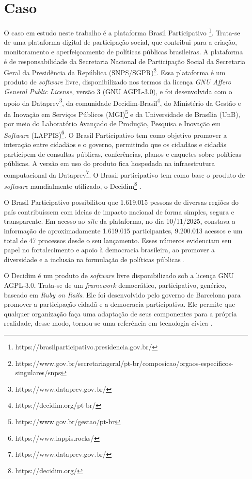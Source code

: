 \section{Caso}
O caso em estudo neste trabalho é a plataforma Brasil Participativo \footnote{https://brasilparticipativo.presidencia.gov.br/}. Trata-se de uma plataforma digital de participação social, que contribui para a criação, monitoramento e aperfeiçoamento de políticas públicas brasileiras. A plataforma é de responsabilidade da Secretaria Nacional de Participação Social da Secretaria Geral da Presidência da República (SNPS/SGPR)\footnote{https://www.gov.br/secretariageral/pt-br/composicao/orgaos-especificos-singulares/snps}. Essa plataforma é um produto de \textit{software} livre, disponibilizado nos termos da licença \textit{GNU Affero General Public License}, versão 3 (GNU AGPL-3.0), e foi desenvolvida com o apoio da Dataprev\footnote{https://www.dataprev.gov.br/}, da comunidade Decidim-Brasil\footnote{https://decidim.org/pt-br/}, do Ministério da Gestão e da Inovação em Serviços Públicos (MGI)\footnote{https://www.gov.br/gestao/pt-br} e da Universidade de Brasília (UnB), por meio do Laboratório Avançado de Produção, Pesquisa e Inovação em \textit{Software} (LAPPIS)\footnote{https://www.lappis.rocks/}. 
O Brasil Participativo tem como objetivo promover a interação entre cidadãos e o governo, permitindo que os cidadãos e cidadãs participem de consultas públicas, conferências, planos e enquetes sobre políticas públicas. 
A versão em uso do produto fica hospedada na infraestrutura computacional da Dataprev\footnote{https://www.dataprev.gov.br/}. O Brasil participativo tem como base o produto de \textit{software} mundialmente utilizado, o Decidim\footnote{https://decidim.org/} \cite{BrasilParticipativo}.

O Brasil Participativo possibilitou que 1.619.015 pessoas de diversas regiões do país contribuíssem com ideias de impacto nacional de forma simples, segura e transparente. Em acesso ao \textit{site} da plataforma, no dia 10/11/2025, constava a informação de aproximadamente 1.619.015 participantes, 9.200.013 acessos e um total de 47 processos desde o seu lançamento. Esses números evidenciam seu papel no fortalecimento e apoio à democracia brasileira, ao promover a diversidade e a inclusão na formulação de políticas públicas \cite{BrasilParticipativo}.

O Decidim é um produto de \textit{software} livre disponibilizado sob a licença GNU AGPL-3.0. Trata-se de um \textit{framework} democrático, participativo, genérico, baseado em \textit{Ruby on Rails}. Ele foi desenvolvido pelo governo de Barcelona para promover a participação cidadã e a democracia participativa. Ele permite que qualquer organização faça uma adaptação de seus componentes para a própria realidade, desse modo, tornou-se uma referência em tecnologia cívica \cite{Decidim}.

